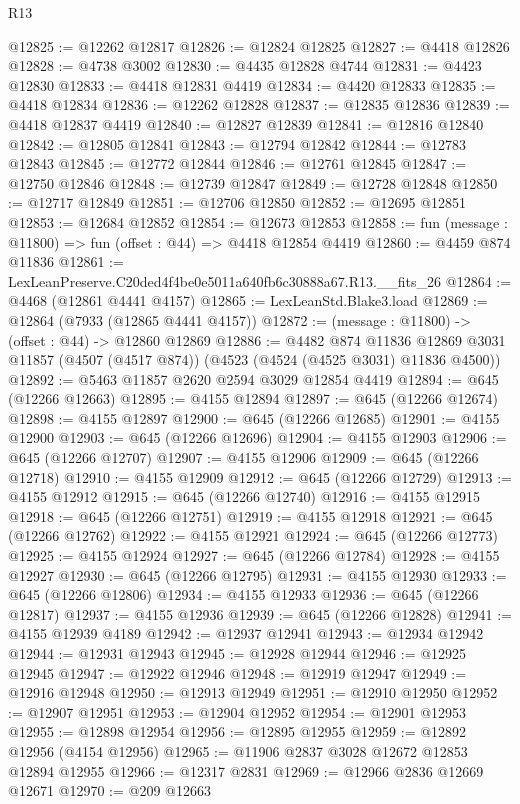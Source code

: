 \begin{lexlean}{R13}
\begin{coremodule}
@12825 := @12262 @12817
@12826 := @12824 @12825
@12827 := @4418 @12826
@12828 := @4738 @3002
@12830 := @4435 @12828 @4744
@12831 := @4423 @12830
@12833 := @4418 @12831 @4419
@12834 := @4420 @12833
@12835 := @4418 @12834
@12836 := @12262 @12828
@12837 := @12835 @12836
@12839 := @4418 @12837 @4419
@12840 := @12827 @12839
@12841 := @12816 @12840
@12842 := @12805 @12841
@12843 := @12794 @12842
@12844 := @12783 @12843
@12845 := @12772 @12844
@12846 := @12761 @12845
@12847 := @12750 @12846
@12848 := @12739 @12847
@12849 := @12728 @12848
@12850 := @12717 @12849
@12851 := @12706 @12850
@12852 := @12695 @12851
@12853 := @12684 @12852
@12854 := @12673 @12853
@12858 := fun (message : @11800) => fun (offset : @44) => @4418 @12854 @4419
@12860 := @4459 @874 @11836
@12861 := LexLeanPreserve.C20ded4f4be0e5011a640fb6c30888a67.R13.__fits_26
@12864 := @4468 (@12861 @4441 @4157)
@12865 := LexLeanStd.Blake3.load
@12869 := @12864 (@7933 (@12865 @4441 @4157))
@12872 := (message : @11800) -> (offset : @44) -> @12860 @12869
@12886 := @4482
    @874
    @11836
    @12869
    @3031
    @11857
    (@4507 (@4517 @874))
    (@4523 (@4524 (@4525 @3031) @11836 @4500))
@12892 := @5463 @11857 @2620 @2594 @3029 @12854 @4419
@12894 := @645 (@12266 @12663)
@12895 := @4155 @12894
@12897 := @645 (@12266 @12674)
@12898 := @4155 @12897
@12900 := @645 (@12266 @12685)
@12901 := @4155 @12900
@12903 := @645 (@12266 @12696)
@12904 := @4155 @12903
@12906 := @645 (@12266 @12707)
@12907 := @4155 @12906
@12909 := @645 (@12266 @12718)
@12910 := @4155 @12909
@12912 := @645 (@12266 @12729)
@12913 := @4155 @12912
@12915 := @645 (@12266 @12740)
@12916 := @4155 @12915
@12918 := @645 (@12266 @12751)
@12919 := @4155 @12918
@12921 := @645 (@12266 @12762)
@12922 := @4155 @12921
@12924 := @645 (@12266 @12773)
@12925 := @4155 @12924
@12927 := @645 (@12266 @12784)
@12928 := @4155 @12927
@12930 := @645 (@12266 @12795)
@12931 := @4155 @12930
@12933 := @645 (@12266 @12806)
@12934 := @4155 @12933
@12936 := @645 (@12266 @12817)
@12937 := @4155 @12936
@12939 := @645 (@12266 @12828)
@12941 := @4155 @12939 @4189
@12942 := @12937 @12941
@12943 := @12934 @12942
@12944 := @12931 @12943
@12945 := @12928 @12944
@12946 := @12925 @12945
@12947 := @12922 @12946
@12948 := @12919 @12947
@12949 := @12916 @12948
@12950 := @12913 @12949
@12951 := @12910 @12950
@12952 := @12907 @12951
@12953 := @12904 @12952
@12954 := @12901 @12953
@12955 := @12898 @12954
@12956 := @12895 @12955
@12959 := @12892 @12956 (@4154 @12956)
@12965 := @11906 @2837 @3028 @12672 @12853 @12894 @12955
@12966 := @12317 @2831
@12969 := @12966 @2836 @12669 @12671
@12970 := @209 @12663

\end{coremodule}
\end{lexlean}
